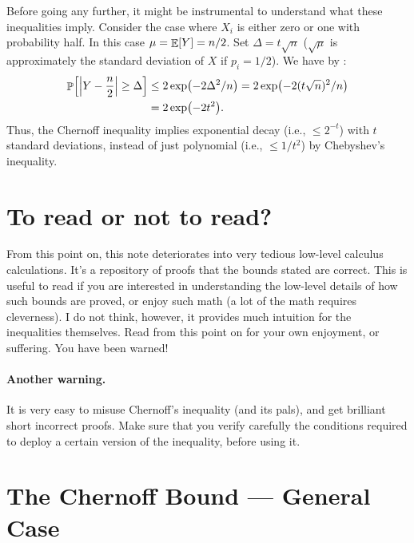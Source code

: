 \begin{remark}
    Before going any further, it might be instrumental to understand what
    these inequalities imply.  Consider the case where $X_i$ is either
    zero or one with probability half. In this case $\mu = \mathop{\mathbb{E}}\!\left[ {Y} \right] =
    n/2$. Set $\Delta = t\sqrt{n}$%
    ($\sqrt{\mu}$ is approximately the standard deviation of $X$ if
    $p_i = 1/2$).  We have by :%
    \begin{align*}
        \Prob{\cardin{Y - \frac{n}{2}} \geq \Delta }
        &\leq 2\exp \pth{-2\Delta^2/n} = 2\exp \pth{-2(t\sqrt{n})^2/n} \\
        &= 2\exp \pth{-2 t^2}.
    \end{align*}
    Thus, the Chernoff inequality implies exponential decay (i.e., $\leq
    2^{-t}$) with $t$ standard deviations, instead of just polynomial
    (i.e., $\leq 1/t^2$) by Chebyshev's inequality.
\end{remark}



\section{To read or not to read?}

From this point on, this note deteriorates into very tedious low-level calculus calculations. It's a repository of proofs that the bounds stated are correct. This is useful to read if you are interested in understanding the low-level details of how such bounds are proved, or enjoy such math (a lot of the math requires cleverness). I do not think, however, it provides much intuition for the inequalities themselves. Read from this point on for your own enjoyment, or suffering. You have been warned!

\paragraph*{Another  warning.}

It is very easy to misuse Chernoff's inequality (and its pals), and get brilliant short incorrect proofs. Make sure that you verify carefully the conditions required to deploy a certain version of the inequality, before using it.



\section{The Chernoff Bound --- General Case}



